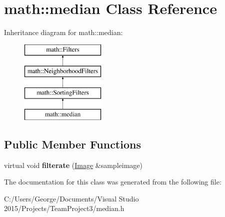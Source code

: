 \hypertarget{classmath_1_1median}{}\section{math\+:\+:median Class Reference}
\label{classmath_1_1median}
Inheritance diagram for math\+:\+:median\+:\begin{figure}[H]
\begin{center}
\leavevmode
\includegraphics[height=4.000000cm]{classmath_1_1median}
\end{center}
\end{figure}
\subsection*{Public Member Functions}
\begin{DoxyCompactItemize}
\item 
\mbox{\label{classmath_1_1median_ab7aee9bfb443bee0bb6766c07978372b}} 
virtual void {\bfseries filterate} (\hyperlink{classmath_1_1_image}{Image} \&sampleimage)
\end{DoxyCompactItemize}


The documentation for this class was generated from the following file\+:\begin{DoxyCompactItemize}
\item 
C\+:/\+Users/\+George/\+Documents/\+Visual Studio 2015/\+Projects/\+Team\+Project3/median.\+h\end{DoxyCompactItemize}
